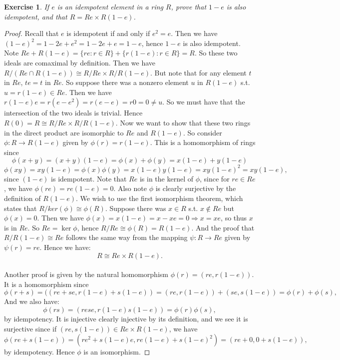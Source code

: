 \documentclass[10pt,oneside,reqno]{amsart}
\theoremstyle{plain}
\newtheorem{e}{Exercise}
\theoremstyle{definition}
\begin{document}
\begin{e}
If $e$ is an idempotent element in a ring $R$, prove that $1 - e$ is also idempotent, and that $R = Re \times R(1-e)$. 
\end{e}
\begin{proof}
Recall that $e$ is idempotent if and only if $e^2 = e$. Then we have $(1 - e)^2 = 1 - 2e + e^2 = 1 - 2e + e = 1 - e$, hence $1 - e$ is also idempotent. Note $Re + R(1 - e) = \{re:r \in R\} + \{r(1 - e):r \in R\} = R$. So these two ideals are comaximal by definition. Then we have $R/(Re \cap R(1 - e)) \cong R/Re \times R/R(1 - e)$. But note that for any element $t$ in $Re$, $te = t$ in $Re$. So suppose there was a nonzero element $u$ in $R(1 - e)$ s.t. $u = r(1-e) \in Re$. Then we have $r(1 - e)e = r(e - e^2)  = r(e - e) = r0 = 0 \neq u$. So we must have that the intersection of the two ideals is trivial. Hence $R(0) = R \cong R/Re \times R/R(1 - e)$. Now we want to show that these two rings in the direct product are isomorphic to $Re$ and $R(1 - e)$. So consider $\phi:R \to R(1 - e)$ given by $\phi(r) = r(1 - e)$. This is a homomorphism of rings since 
$$
\phi(x + y) = (x + y)(1 - e) =\phi(x) + \phi(y) = x(1 - e) + y(1 - e)
$$
$$
\phi(xy) = xy(1 - e) = \phi(x)\phi(y) = x(1 - e)y(1 - e) = xy(1 - e)^2 = xy(1 - e),
$$
 since $(1 - e)$ is idempotent. Note that $Re$ is in the kernel of $\phi$, since for $re \in Re$, we have $\phi(re) = re(1 - e) = 0$. Also note $\phi$ is clearly surjective by the definition of $R(1 - e)$. We wish to use the first isomorphism theorem, which states that $R/ker(\phi) \cong \phi(R)$. Suppose there was $x \in R$ s.t. $x \notin Re$ but $\phi(x) = 0$. Then we have $\phi(x) = x(1 - e) = x - xe = 0 \Rightarrow x = xe$, so thus $x$ is in $Re$. So $Re = \ker \phi$, hence $R/Re \cong \phi(R) = R(1 - e)$. And the proof that $R/R(1 - e) \cong Re$ follows the same way from the mapping $\psi:R \to Re$ given by $\psi(r) = re$. Hence we have: 
 $$
 R \cong Re \times R( 1-e). 
 $$
 \\
 Another proof is given by the natural homomorphism $\phi(r) = (re,r(1 - e))$. It is a homomorphism since 
 $$
 \phi(r + s) = ((re + se, r(1 - e) + s(1 - e)) = (re,r(1 - e)) + (se,s(1 - e)) = \phi(r) + \phi(s),
 $$
 And we also have:  
 $$
 \phi(rs) = (rese,r(1 - e)s(1 - e)) = \phi(r)\phi(s),
 $$
  by idempotency. It is injective clearly injective by its definition, and we see it is surjective since if $(re,s(1 - e)) \in Re \times R(1- e)$, we have 
  $$
  \phi(re + s(1 - e)) = (re^2 + s(1 - e)e,re(1 -  e) + s(1 -e)^2) = (re + 0,0 + s(1 - e)),
  $$ 
  by idempotency. Hence $\phi$ is an isomorphism. 
\end{proof}
\end{document}
